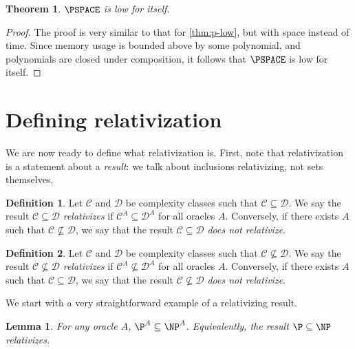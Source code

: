 \documentclass[english]{reedthesis}
\theoremstyle{plain}
\newtheorem{thm}{Theorem}[section]
\newtheorem{lemma}[lemma]{Lemma}
\theoremstyle{definition}
\newtheorem{defn}[defn]{Definition}
\theoremstyle{remark}
\begin{document}
\begin{thm}\label{thm:pspace-low}
  $\PSPACE$ is low for itself.
\end{thm}

\begin{proof}
  The proof is very similar to that for \cref{thm:p-low}, but with space instead
  of time. Since memory usage is bounded above by some polynomial, and
  polynomials are closed under composition, it follows that $\PSPACE$ is low for
  itself.
\end{proof}

\section{Defining relativization}

We are now ready to define what relativization is. First, note that
relativization is a statement about a \emph{result}: we talk about inclusions
relativizing, not sets themselves.

\begin{defn}\label{def:relativization}
  Let $\mathcal{C}$ and $\mathcal{D}$ be complexity classes such that $\mathcal{C} \subseteq \mathcal{D}$. We say the result
  $\mathcal{C} \subseteq \mathcal{D}$ \emph{relativizes} if $\mathcal{C}^{A} \subseteq \mathcal{D}^{A}$ for all oracles $A$. Conversely,
  if there exists $A$ such that $\mathcal{C} \nsubseteq \mathcal{D}$, we say that the result $\mathcal{C} \subseteq \mathcal{D}$
  \emph{does not relativize}.
\end{defn}

\begin{defn}\label{def:relativization-ne}
  Let $\mathcal{C}$ and $\mathcal{D}$ be complexity classes such that $\mathcal{C} \nsubseteq \mathcal{D}$. We say the result
  $\mathcal{C} \nsubseteq \mathcal{D}$ \emph{relativizes} if $\mathcal{C}^{A} \nsubseteq \mathcal{D}^{A}$ for all oracles $A$. Conversely,
  if there exists $A$ such that $\mathcal{C} \subseteq \mathcal{D}$, we say that the result $\mathcal{C} \nsubseteq \mathcal{D}$
  \emph{does not relativize}.
\end{defn}

We start with a very straightforward example of a relativizing result.

\begin{lemma}\label{lem:pa-subset-npa}
  For any oracle $A$, $\P^{A} \subseteq \NP^{A}$. Equivalently, the result $\P \subseteq \NP$
  relativizes.
\end{lemma}
\end{document}
